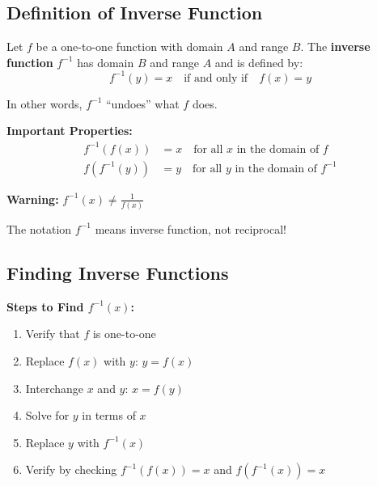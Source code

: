 \documentclass[12pt,a4paper]{article}
\begin{document}
\subsection{Definition of Inverse Function}

\begin{definition}
Let $f$ be a one-to-one function with domain $A$ and range $B$. The \textbf{inverse function} $f^{-1}$ has domain $B$ and range $A$ and is defined by:
\[
f^{-1}(y) = x \quad \text{if and only if} \quad f(x) = y
\]

In other words, $f^{-1}$ ``undoes'' what $f$ does.
\end{definition}

\begin{note}
\textbf{Important Properties:}
\begin{align*}
f^{-1}(f(x)) &= x \quad \text{for all } x \text{ in the domain of } f \\
f(f^{-1}(y)) &= y \quad \text{for all } y \text{ in the domain of } f^{-1}
\end{align*}

\textbf{Warning:} $f^{-1}(x) \neq \frac{1}{f(x)}$

The notation $f^{-1}$ means inverse function, not reciprocal!
\end{note}

\subsection{Finding Inverse Functions}

\begin{strategy}
\textbf{Steps to Find $f^{-1}(x)$:}

\begin{enumerate}
    \item Verify that $f$ is one-to-one
    \item Replace $f(x)$ with $y$: $y = f(x)$
    \item Interchange $x$ and $y$: $x = f(y)$
    \item Solve for $y$ in terms of $x$
    \item Replace $y$ with $f^{-1}(x)$
    \item Verify by checking $f^{-1}(f(x)) = x$ and $f(f^{-1}(x)) = x$
\end{enumerate}
\end{strategy}
\end{document}
